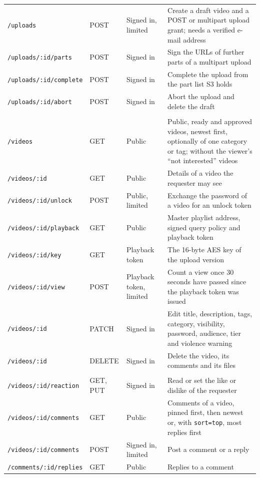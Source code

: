 \begin{footnotesize}
\begin{longtable}{>{\raggedright\arraybackslash}p{} >{\raggedright\arraybackslash}p{} >{\raggedright\arraybackslash}p{} >{\raggedright\arraybackslash}p{}}
\texttt{/uploads} & POST & Signed in, limited & Create a draft video and a POST or multipart upload grant; needs a verified e-mail address \\
\texttt{/uploads/:id/parts} & POST & Signed in & Sign the URLs of further parts of a multipart upload \\
\texttt{/uploads/:id/complete} & POST & Signed in & Complete the upload from the part list S3 holds \\
\texttt{/uploads/:id/abort} & POST & Signed in & Abort the upload and delete the draft \\
\midrule
\multicolumn{4}{l}{\textit{Videos and playback}} \\
\texttt{/videos} & GET & Public & Public, ready and approved videos, newest first, optionally of one category or tag; without the viewer's ``not interested'' videos \\
\texttt{/videos/:id} & GET & Public & Details of a video the requester may see \\
\texttt{/videos/:id/unlock} & POST & Public, limited & Exchange the password of a video for an unlock token \\
\texttt{/videos/:id/playback} & GET & Public & Master playlist address, signed query policy and playback token \\
\texttt{/videos/:id/key} & GET & Playback token & The 16-byte AES key of the upload version \\
\texttt{/videos/:id/view} & POST & Playback token, limited & Count a view once 30 seconds have passed since the playback token was issued \\
\texttt{/videos/:id} & PATCH & Signed in & Edit title, description, tags, category, visibility, password, audience, tier and violence warning \\
\texttt{/videos/:id} & DELETE & Signed in & Delete the video, its comments and its files \\
\midrule
\multicolumn{4}{l}{\textit{Community}} \\
\texttt{/videos/:id/reaction} & GET, PUT & Signed in & Read or set the like or dislike of the requester \\
\texttt{/videos/:id/comments} & GET & Public & Comments of a video, pinned first, then newest or, with \texttt{sort=top}, most replies first \\
\texttt{/videos/:id/comments} & POST & Signed in, limited & Post a comment or a reply \\
\texttt{/comments/:id/replies} & GET & Public & Replies to a comment \\

\end{longtable}
\end{footnotesize}
